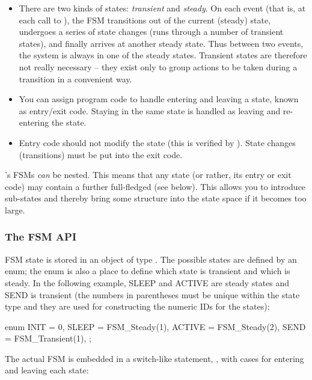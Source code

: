 \begin{itemize}
  \item There are two kinds of states: \textit{transient} and \textit{steady}. On
    each event (that is, at each call to ), the FSM
    transitions out of the current (steady) state, undergoes a series of state
    changes (runs through a number of transient states), and finally arrives at
    another steady state. Thus between two events, the system is always in one of
    the steady states. Transient states are therefore not really necessary -- they
    exist only to group actions to be taken during a transition in a convenient way.
  \item You can assign program code to handle entering and leaving a state, known
    as entry/exit code. Staying in the same state is handled as leaving and
    re-entering the state.
  \item Entry code should not modify the state (this is verified by {\opp}). State
    changes (transitions) must be put into the exit code.
\end{itemize}

{\opp}'s FSMs \textit{can} be nested. This means
that any state (or rather, its entry or exit code) may contain a
further full-fledged  (see below). This allows you
to introduce sub-states and thereby bring some structure into the
state space if it becomes too large.


\subsubsection{The FSM API}
\label{sec:simple-modules:fsm-api}

FSM state is stored in an object of type . The possible states
are defined by an enum; the enum is also a place to define which
state is transient and which is steady. In the following example, SLEEP
and ACTIVE are steady states and SEND is transient (the numbers
in parentheses must be unique within the state type and they are used
for constructing the numeric IDs for the states):

\begin{cpp}
enum {
  INIT = 0,
  SLEEP = FSM_Steady(1),
  ACTIVE = FSM_Steady(2),
  SEND = FSM_Transient(1),
};
\end{cpp}

The actual FSM is embedded in a switch-like statement, ,
with cases for entering and leaving each state:

